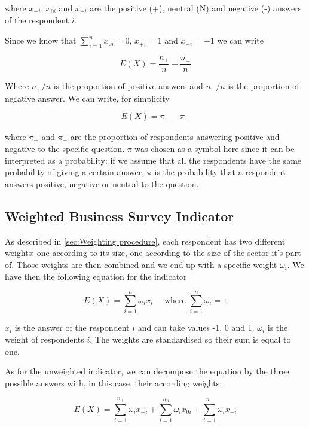 \documentclass[12pt,a4paper,oneside]{book}
\begin{document}
where 
$x_{+i}$, $x_{0i}$ and $x_{-i}$ are the positive (+), neutral (N) and negative (-) answers of the respondent $i$.

Since we know that $\sum_{i=1}^n x_{0i} = 0$, $x_{+i} = 1$ and $x_{-i} = -1$ we can write

\begin{equation}
    E(X) = \frac{n_+}{n}  - \frac{n_-}{n}
\end{equation} 

Where ${n_+}/{n}$ is the proportion of positive answers and ${n_-}/{n}$ is the proportion of negative answer. We can write, for simplicity

\begin{equation}
    E(X) = \pi_+ - \pi_-  \label{eq: BSI Unweighted}
\end{equation}

where $\pi_+$ and $\pi_-$ are the proportion of respondents answering positive and negative to the specific question.
$\pi$ was chosen as a symbol here since it can be interpreted as a probability: if we assume that all the respondents have the same probability of giving a certain answer, $\pi$ is the probability that a respondent answers positive, negative or neutral to the question. 


\subsection{Weighted Business Survey Indicator}

As described in \autoref{sec:Weighting procedure}, each respondent has two different weights: one according to its size, one according to the size of the sector it's part of. Those weights are then combined and we end up with a specific weight $\omega_i$.
We have then the following equation for the indicator

\begin{equation}
    E(X) = \sum_{i=1}^n \omega_i x_i  \quad \text{  where  } \sum_{i=1}^n \omega_i =  1
\end{equation} 

$x_i$ is the answer of the respondent $i$ and can take values -1, 0 and 1.
$\omega_i$ is the weight of respondents $i$. 
The weights are standardised so their sum is equal to one.

As for the unweighted indicator, we can decompose the equation by the three possible answers with, in this case, their according weights.

\begin{equation}
    E(X) = \sum_{i=1}^{n_+} \omega_{i} x_{+i} + \sum_{i=1}^{n_0} \omega_{i} x_{0i} + \sum_{i=1}^{n_-} \omega_{i} x_{-i}
 \end{equation}
\end{document}
